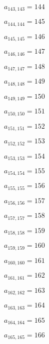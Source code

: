 \documentclass[a4paper,12pt]{article}
\begin{document}
$a _{ 143, 143 } = 144$

$a _{ 144, 144 } = 145$

$a _{ 145, 145 } = 146$

$a _{ 146, 146 } = 147$

$a _{ 147, 147 } = 148$

$a _{ 148, 148 } = 149$

$a _{ 149, 149 } = 150$

$a _{ 150, 150 } = 151$

$a _{ 151, 151 } = 152$

$a _{ 152, 152 } = 153$

$a _{ 153, 153 } = 154$

$a _{ 154, 154 } = 155$

$a _{ 155, 155 } = 156$

$a _{ 156, 156 } = 157$

$a _{ 157, 157 } = 158$

$a _{ 158, 158 } = 159$

$a _{ 159, 159 } = 160$

$a _{ 160, 160 } = 161$

$a _{ 161, 161 } = 162$

$a _{ 162, 162 } = 163$

$a _{ 163, 163 } = 164$

$a _{ 164, 164 } = 165$

$a _{ 165, 165 } = 166$
\end{document}
